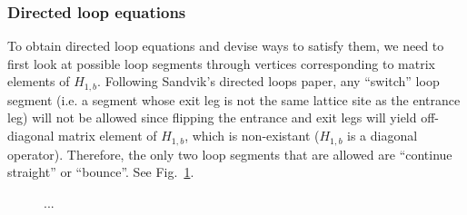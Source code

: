 \documentclass[12pt]{article}
\begin{document}
\subsubsection{Directed loop equations}

To obtain directed loop equations and devise ways to satisfy them, we need to first look at possible loop segments through vertices corresponding to matrix elements of $H_{1,b}$.
Following Sandvik's directed loops paper, any ``switch'' loop segment (i.e. a segment whose exit leg is not the same lattice site as the entrance leg) will not be allowed since flipping the entrance and exit legs will yield off-diagonal matrix element of $H_{1,b}$, which is non-existant ($H_{1,b}$ is a diagonal operator).
Therefore, the only two loop segments that are allowed are ``continue straight'' or ``bounce''. See Fig.~\ref{fig:continue_bounce}. 

\begin{figure}
    \centering
\caption{...} \label{fig:continue_bounce}
\end{figure}
\end{document}
